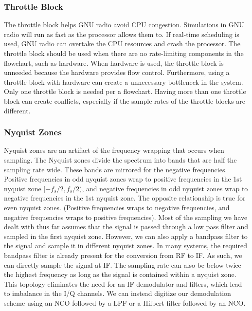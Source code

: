 \documentclass{article}
\begin{document}

	\subsubsection{Throttle Block}
	The throttle block helps GNU radio avoid CPU congestion. Simulations in GNU radio will run as fast as the processor allows them to. If real-time scheduling is used, GNU radio can overtake the CPU resources and crash the processor. The throttle block should be used when there are no rate-limiting components in the flowchart, such as hardware. When hardware is used, the throttle block is unneeded because the hardware provides flow control. Furthermore, using a throttle block with hardware can create a unnecessary bottleneck in the system. Only one throttle block is needed per a flowchart. Having more than one throttle block can create conflicts, especially if the sample rates of the throttle blocks are different.
		
		
	
	\subsubsection{Nyquist Zones}
	Nyquist zones are an artifact of the frequency wrapping that occurs when sampling. The Nyquist zones divide the spectrum into bands that are half the sampling rate wide. These bands are mirrored for the negative frequencies. Positive frequencies in odd nyquist zones wrap to positive frequencies in the 1st nyquist zone $[-f_s/2, f_s/2)$, and negative frequencies in odd nyquist zones wrap to negative frequencies in the 1st nyquist zone. The opposite relationship is true for even nyquist zones. (Positive frequencies wraps to negative frequencies, and negative frequencies wraps to positive frequencies). Most of the sampling we have dealt with thus far assumes that the signal is passed through a low pass filter and sampled in the first nyquist zone. However, we can also apply a bandpass filter to the signal and sample it in different nyquist zones. In many systems, the required bandpass filter is already present for the conversion from RF to IF. As such, we can directly sample the signal at IF. The sampling rate can also be below twice the highest frequency as long as the signal is contained within a nyquist zone. This topology eliminates the need for an IF demodulator and filters, which lead to imbalance in the I/Q channels. We can instead digitize our demodulation scheme using an NCO followed by a LPF or a Hilbert filter followed by an NCO.
	
\end{document}
